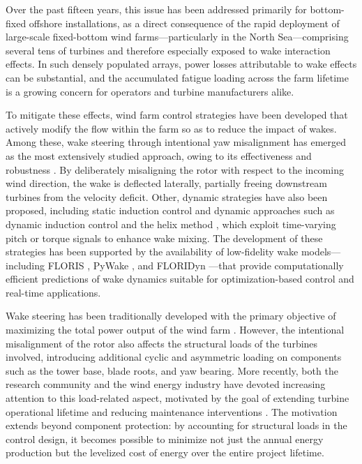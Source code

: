 \documentclass[final,5p,times,twocolumn]{elsarticle}
\begin{document}
Over the past fifteen years, this issue has been addressed primarily for bottom-fixed offshore installations, as a direct consequence of the rapid deployment of large-scale fixed-bottom wind farms---particularly in the North Sea---comprising several tens of turbines and therefore especially exposed to wake interaction effects. In such densely populated arrays, power losses attributable to wake effects can be substantial, and the accumulated fatigue loading across the farm lifetime is a growing concern for operators and turbine manufacturers alike.

To mitigate these effects, wind farm control strategies have been developed that actively modify the flow within the farm so as to reduce the impact of wakes. Among these, wake steering through intentional yaw misalignment has emerged as the most extensively studied approach, owing to its effectiveness and robustness \cite{wake_steering_control, FLEMING2014211}. By deliberately misaligning the rotor with respect to the incoming wind direction, the wake is deflected laterally, partially freeing downstream turbines from the velocity deficit. Other, dynamic strategies have also been proposed, including static induction control \cite{induction_control, Bartl_2016} and dynamic approaches such as dynamic induction control \cite{Pulse_control} and the helix method \cite{Helix_control}, which exploit time-varying pitch or torque signals to enhance wake mixing. The development of these strategies has been supported by the availability of low-fidelity wake models---including FLORIS \cite{floris_model}, PyWake \cite{pywake2.5.0_2023}, and FLORIDyn \cite{Becker_2022}---that provide computationally efficient predictions of wake dynamics suitable for optimization-based control and real-time applications.

Wake steering has been traditionally developed with the primary objective of maximizing the total power output of the wind farm \cite{Bastankhah_Port-Agel_2016, wes-6-701-2021}. However, the intentional misalignment of the rotor also affects the structural loads of the turbines involved, introducing additional cyclic and asymmetric loading on components such as the tower base, blade roots, and yaw bearing. More recently, both the research community and the wind energy industry have devoted increasing attention to this load-related aspect, motivated by the goal of extending turbine operational lifetime and reducing maintenance interventions \cite{Guillore_2024, wes-9-2039-2024, en17020346}. The motivation extends beyond component protection: by accounting for structural loads in the control design, it becomes possible to minimize not just the annual energy production but the levelized cost of energy over the entire project lifetime.
\end{document}
